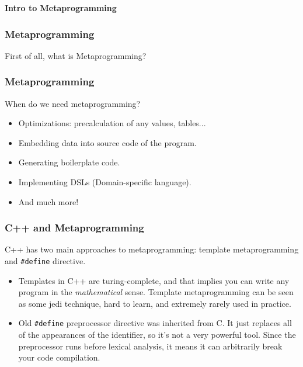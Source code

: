 \documentclass[aspectratio=1610,t]{beamer}
\begin{document}

\begin{frame}[c]
\centering\Huge\textbf{Intro to Metaprogramming}
\end{frame}


\begin{frame}[fragile]
\frametitle{Metaprogramming}
First of all, what is Metaprogramming?

\end{frame}


\begin{frame}[fragile]
\frametitle{Metaprogramming}
When do we need metaprogramming?

\begin{itemize}
    \item<2-> Optimizations: precalculation of any values, tables...
    \item<3-> Embedding data into source code of the program.
    \item<4-> Generating boilerplate code.
    \item<5-> Implementing DSLs (Domain-specific language).
    \item<5-> And much more!
\end{itemize}
\end{frame}


\begin{frame}[fragile]
\frametitle{C++ and Metaprogramming}
C++ has two main approaches to metaprogramming: template metaprogramming and \texttt{\#define} directive.

\begin{itemize}
    \item<2-> Templates in C++ are turing-complete, and that implies you can write any program in the \textit{mathematical} sense. Template metaprogramming can be seen as some jedi technique, hard to learn, and extremely rarely used in practice.
    \item<3-> Old \texttt{\#define} preprocessor directive was inherited from C. It just replaces all of the appearances of the identifier, so it's not a very powerful tool. Since the preprocessor runs before lexical analysis, it means it can arbitrarily break your code compilation.
\end{itemize}
\end{frame}
\end{document}

